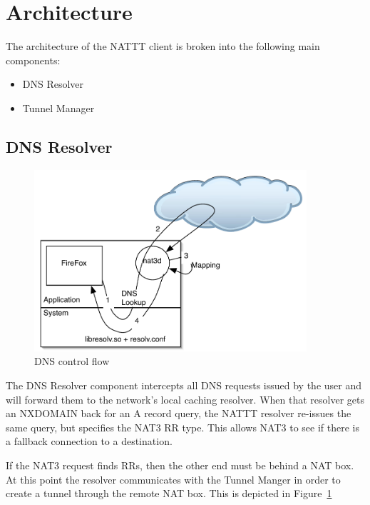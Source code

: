 \section{Architecture}\label{sec:arch}

The architecture of the NATTT client is broken into the following main components:
\begin{itemize}
\item DNS Resolver
\item Tunnel Manager
\end{itemize}

\subsection{DNS Resolver}

\begin{figure}
\begin{center}
\includegraphics[width=0.9\textwidth]{figs/dns-control-flow}
\end{center}
\caption{DNS control flow}
\label{fig:dns-control-flow}
\end{figure}

The DNS Resolver component intercepts all DNS requests issued by the user and will forward them to the network's local caching resolver.  When
that resolver gets an NXDOMAIN back for an A record query, the NATTT resolver re-issues the same query, but specifies the NAT3 RR type.
This allows NAT3 to see if there is a fallback connection to a destination.

If the NAT3 request finds RRs, then the other end must be behind a NAT box.  At this point the resolver communicates with the Tunnel Manger 
in order to create a tunnel through the remote NAT box.  This is depicted in Figure~\ref{fig:dns-control-flow}

